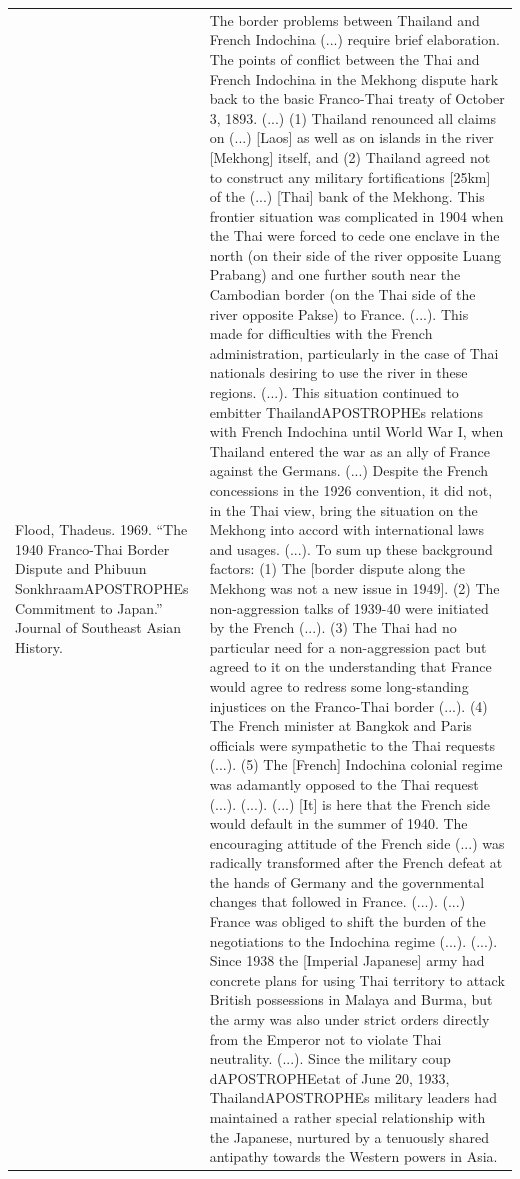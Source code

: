 {\begin{longtable}{p{}p{}}
\\
Flood, Thadeus. 1969. “The 1940 Franco-Thai Border Dispute and Phibuun SonkhraamAPOSTROPHEs Commitment to Japan.” Journal of Southeast Asian History. & The border problems between Thailand and French Indochina (...) require brief elaboration. The points of conflict between the Thai and French Indochina in the Mekhong dispute hark back to the basic Franco-Thai treaty of October 3, 1893. (...) (1) Thailand renounced all claims on (...) [Laos] as well as on islands in the river [Mekhong] itself, and (2) Thailand agreed not to construct any military fortifications [25km] of the (...) [Thai] bank of the Mekhong. This frontier situation was complicated in 1904 when the Thai were forced to cede one enclave in the north (on their side of the river opposite Luang Prabang) and one further south near the Cambodian border (on the Thai side of the river opposite Pakse) to France. (...). This made for difficulties with the French administration, particularly in the case of Thai nationals desiring to use the river in these regions. (...). This situation continued to embitter ThailandAPOSTROPHEs relations with French Indochina until World War I, when Thailand entered the war as an ally of France against the Germans. (...) Despite the French concessions in the 1926 convention, it did not, in the Thai view, bring the situation on the Mekhong into accord with international laws and usages. (...). To sum up these background factors: (1) The [border dispute along the Mekhong was not a new issue in 1949]. (2) The non-aggression talks of 1939-40 were initiated by the French (...). (3) The Thai had no particular need for a non-aggression pact but agreed to it on the understanding that France would agree to redress some long-standing injustices on the Franco-Thai border (...). (4) The French minister at Bangkok and Paris officials were sympathetic to the Thai requests (...). (5) The [French] Indochina colonial regime was adamantly opposed to the Thai request (...). (...). (...) [It] is here that the French side would default in the summer of 1940. The encouraging attitude of the French side (...) was radically transformed after the French defeat at the hands of Germany and the governmental changes that followed in France. (...). (...) France was obliged to shift the burden of the negotiations to the Indochina regime (...). (...). Since 1938 the [Imperial Japanese] army had concrete plans for using Thai territory to attack British possessions in Malaya and Burma, but the army was also under strict orders directly from the Emperor not to violate Thai neutrality. (...). Since the military coup dAPOSTROPHEetat of June 20, 1933, ThailandAPOSTROPHEs military leaders had maintained a rather special relationship with the Japanese, nurtured by a tenuously shared antipathy towards the Western powers in Asia.

\end{longtable}}
